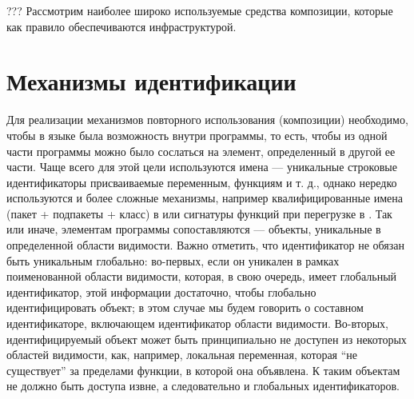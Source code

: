 {??? Рассмотрим наиболее широко используемые средства композиции, которые как правило обеспечиваются инфраструктурой.

\section{Механизмы идентификации}

Для реализации механизмов повторного использования (композиции) необходимо, чтобы в языке была возможность  внутри программы, то есть, чтобы из одной части программы можно было сослаться на элемент, определенный в другой ее части. Чаще всего для этой цели используются имена --- уникальные строковые идентификаторы присваиваемые переменным, функциям и т. д., однако нередко используются и более сложные механизмы, например квалифицированные имена (пакет + подпакеты + класс) в  \cite{JLS} или сигнатуры функций при перегрузке в  \cite{???}. Так или иначе, элементам программы сопоставляются  --- объекты, уникальные в определенной области видимости. Важно отметить, что идентификатор не обязан быть уникальным глобально: во-первых, если он уникален в рамках поименованной области видимости, которая, в свою очередь, имеет глобальный идентификатор, этой информации достаточно, чтобы глобально идентифицировать объект; в этом случае мы будем говорить о составном идентификаторе, включающем идентификатор области видимости. Во-вторых, идентифицируемый объект может быть принципиально не доступен из некоторых областей видимости, как, например, локальная переменная, которая ``не существует'' за пределами функции, в которой она объявлена. К таким объектам не должно быть доступа извне, а следовательно и глобальных идентификаторов.


}
